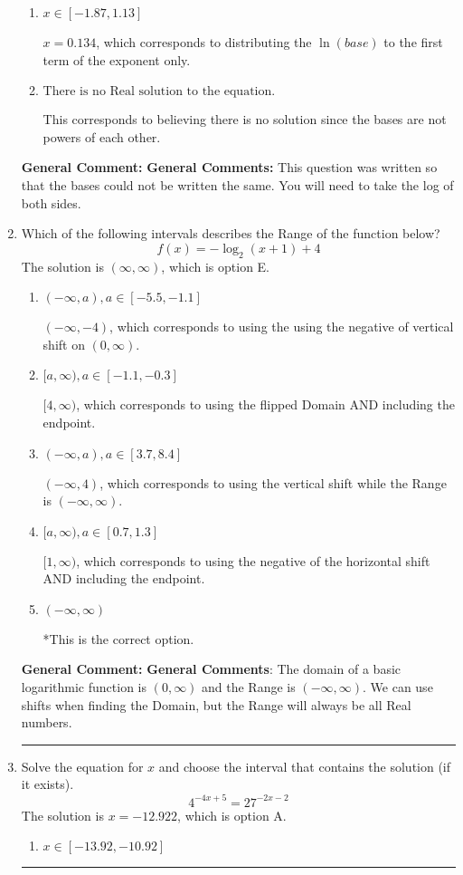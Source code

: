 \documentclass{extbook}[14pt]
\newcommand{\litem}[1]{\item #1

\rule{\textwidth}{0.4pt}}
\begin{document}
\begin{enumerate}
{\begin{enumerate}[label=\Alph*.]
* $x = -2.170$, which is the correct option.
\item \( x \in [-1.87, 1.13] \)

$x = 0.134$, which corresponds to distributing the $\ln(base)$ to the first term of the exponent only.
\item \( \text{There is no Real solution to the equation.} \)

This corresponds to believing there is no solution since the bases are not powers of each other.
\end{enumerate}

\textbf{General Comment:} \textbf{General Comments:} This question was written so that the bases could not be written the same. You will need to take the log of both sides.
}
\litem{
Which of the following intervals describes the Range of the function below?
\[ f(x) = -\log_2{(x+1)}+4 \]The solution is \( (\infty, \infty) \), which is option E.\begin{enumerate}[label=\Alph*.]
\item \( (-\infty, a), a \in [-5.5, -1.1] \)

$(-\infty, -4)$, which corresponds to using the using the negative of vertical shift on $(0, \infty)$.
\item \( [a, \infty), a \in [-1.1, -0.3] \)

$[4, \infty)$, which corresponds to using the flipped Domain AND including the endpoint.
\item \( (-\infty, a), a \in [3.7, 8.4] \)

$(-\infty, 4)$, which corresponds to using the vertical shift while the Range is $(-\infty, \infty)$.
\item \( [a, \infty), a \in [0.7, 1.3] \)

$[1, \infty)$, which corresponds to using the negative of the horizontal shift AND including the endpoint.
\item \( (-\infty, \infty) \)

*This is the correct option.
\end{enumerate}

\textbf{General Comment:} \textbf{General Comments}: The domain of a basic logarithmic function is $(0, \infty)$ and the Range is $(-\infty, \infty)$. We can use shifts when finding the Domain, but the Range will always be all Real numbers.
}
\litem{
Solve the equation for $x$ and choose the interval that contains the solution (if it exists).
\[ 4^{-4x+5} = 27^{-2x-2} \]The solution is \( x = -12.922 \), which is option A.\begin{enumerate}[label=\Alph*.]
\item \( x \in [-13.92, -10.92] \)


\end{enumerate}}
\end{enumerate}
\end{document}
